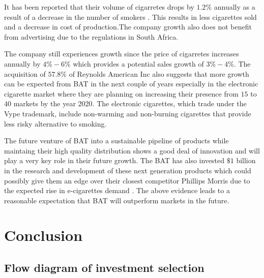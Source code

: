 \documentclass[letterpaper, 10 pt, conference]{ieeeconf}  %
\begin{document}
It has been reported that their volume of cigarretes drops by $1.2\%$ annually as a result of a decrease in the number of smokers \cite{BAT_nextgen}. This results in less cigarettes sold and a decrease in cost of production.The company growth also does not benefit from advertising due to the regulations in South Africa.

The company still experiences growth since the price of cigarretes increases annually by $4\%-6\%$ \cite{BAT_hist} which provides a potential sales growth of $3\%-4\%$. The acquisition of $57.8\%$ of Reynolds American Inc \cite{BAT_vap} also suggests that more growth can be expected from BAT in the next couple of years especially in the electronic cigarette market where they are planning on increasing their presence from $15$ to $40$ markets by the year 2020. The electronic cigarettes, which trade under the Vype trademark, include non-warming and non-burning cigarettes that provide less risky alternative to smoking.

The future venture of BAT into a sustainable pipeline of products while maintaing their high quality distribution shows a good deal of innovation and will play a very key role in their future growth. The BAT has also invested $\$1$ billion in the research and development of these next generation products which could possibly give them an edge over their closest competitor Phillips Morris due to the expected rise in e-cigarettes demand \cite{BAT_comp}\cite{BAT_nextgen}. The above evidence leads to a reasonable expectation that BAT will outperform markets in the future.

\section{Conclusion}





 

\cleardoublepage
\appendix

\subsection{Flow diagram of investment selection}
\end{document}
